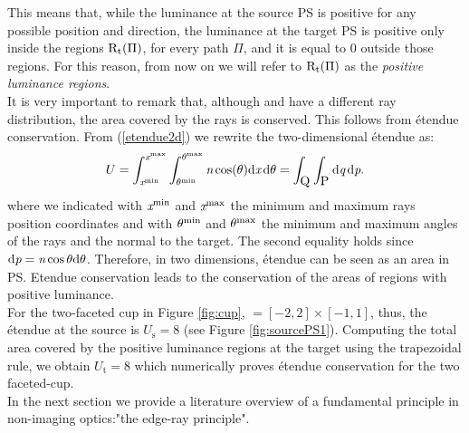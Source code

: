 This means that, while the luminance at the source PS is positive for any possible position and direction, the luminance at the target PS is positive only inside the regions $\mbox{$\textup{R}$}_\textrm{t}(\Pi)$, for every path $\Pi$, and it is equal to $0$ outside those regions. For this reason, from now on we will refer to $\mbox{$\textup{R}$}_\textrm{t}(\Pi)$ as the \textit{positive luminance regions}. \\ \indent
It is very important to remark that, although  and  have a different ray distribution, the area covered by the rays is conserved. This follows from \'{e}tendue conservation. From (\ref{etendue2d}) we rewrite the two-dimensional \'{e}tendue as:
\begin{equation}
U = \int_{\textit{x}^{\textrm{min}}}^{\textit{x}^{\textrm{max}}} \int_{\theta^{\textrm{min}}}^{\theta^{\textrm{max}}} \textit{n} \cos(\theta)\textrm{d}\textit{x}\,\textrm{d}\theta= \int_{\mbox{$\textup{Q}_{\textit{}}$}}\int_{\mbox{$\textup{P}_{\textit{}}$}} \textrm{d}\textit{q}\,\textrm{d}\textit{p}.
\end{equation}
where we indicated with $\textit{x}^{\textrm{min}}$ and $\textit{x}^{\textrm{max}}$ the minimum and maximum rays position coordinates and with $\theta^{\textrm{min}}$ and $\theta^{\textrm{max}}$ the minimum and maximum angles of the rays and the normal to the target. The second equality holds since $\textrm{d}\textit{p}= \textit{n}\cos \theta\textrm{d}\theta$.
Therefore, in two dimensions, \'{e}tendue can be seen as an area in PS. Etendue conservation leads to the conservation of the areas of regions with positive luminance.\\ \indent
For the two-faceted cup in Figure \ref{fig:cup}, $= [-2,2]\times[-1,1]$, thus, the \'{e}tendue at the source is $U_\textrm{s}=8$ (see Figure \ref{fig:sourcePS1}). Computing the total area covered by the positive luminance regions at the target using the trapezoidal rule, we obtain $U_\textrm{t}=8$ which numerically proves \'{e}tendue conservation for the two faceted-cup. \\ \indent 
In the next section we provide a literature overview of a fundamental principle in non-imaging optics:"the edge-ray principle".

